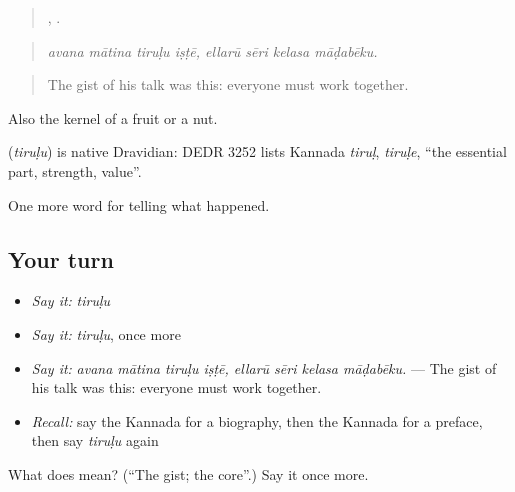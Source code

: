 \begin{quote}
   ,    .
\end{quote}

\begin{quote}
\emph{avana mātina tiruḷu iṣṭē, ellarū sēri kelasa māḍabēku.}
\end{quote}

\begin{quote}
The gist of his talk was this: everyone must work together.
\end{quote}

Also the kernel of a fruit or a nut.

\begin{cousinweb}
\textbf{} (\emph{tiruḷu}) is native Dravidian: DEDR 3252 lists Kannada \emph{tiruḷ}, \emph{tiruḷe}, \textquotedblleft{}the essential part, strength, value\textquotedblright{}.
\end{cousinweb}

\begin{grammarlens}[title={What you've built}]
One more word for telling what happened.
\end{grammarlens}

\subsection*{Your turn}
\begin{itemize}
\raggedright
  \item \emph{Say it:} \emph{tiruḷu}
  \item \emph{Say it:} \emph{tiruḷu}, once more
  \item \emph{Say it:} \emph{avana mātina tiruḷu iṣṭē, ellarū sēri kelasa māḍabēku.} — The gist of his talk was this: everyone must work together.
  \item \emph{Recall:} say the Kannada for a biography, then the Kannada for a preface, then say \emph{tiruḷu} again
\end{itemize}

\begin{tcolorbox}[breakable,colback=teal!4,colframe=teal!35!black,title={Before you move on}]
What does  mean? (\textquotedblleft{}The gist; the core\textquotedblright{}.) Say it once more.
\end{tcolorbox}
